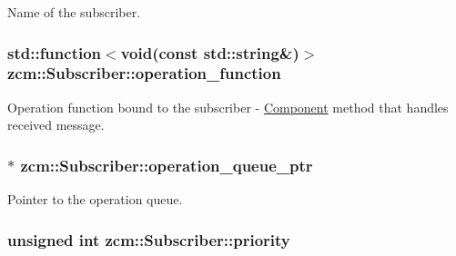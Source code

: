 Name of the subscriber. 

\subsubsection[{\texorpdfstring{operation\+\_\+function}{operation_function}}]{\setlength{\rightskip}{0pt plus 5cm}std\+::function$<$void(const std\+::string\&)$>$ zcm\+::\+Subscriber\+::operation\+\_\+function\hspace{0.3cm}{\ttfamily [private]}}\hypertarget{classzcm_1_1Subscriber_aee61c147a26fd83f6e69e5fed48d8221}{}\label{classzcm_1_1Subscriber_aee61c147a26fd83f6e69e5fed48d8221}


Operation function bound to the subscriber -\/ \hyperlink{classzcm_1_1Component}{Component} method that handles received message. 

\subsubsection[{\texorpdfstring{operation\+\_\+queue\+\_\+ptr}{operation_queue_ptr}}]{$\ast$ zcm\+::\+Subscriber\+::operation\+\_\+queue\+\_\+ptr\hspace{0.3cm}{\ttfamily [private]}}\hypertarget{classzcm_1_1Subscriber_a1cd579aa570832f9656b9fa24747dde3}{}\label{classzcm_1_1Subscriber_a1cd579aa570832f9656b9fa24747dde3}


Pointer to the operation queue. 

\subsubsection[{\texorpdfstring{priority}{priority}}]{\setlength{\rightskip}{0pt plus 5cm}unsigned int zcm\+::\+Subscriber\+::priority\hspace{0.3cm}{\ttfamily [private]}}\hypertarget{classzcm_1_1Subscriber_a208baedba808c9229887ab8af00725fd}{}\label{classzcm_1_1Subscriber_a208baedba808c9229887ab8af00725fd}


